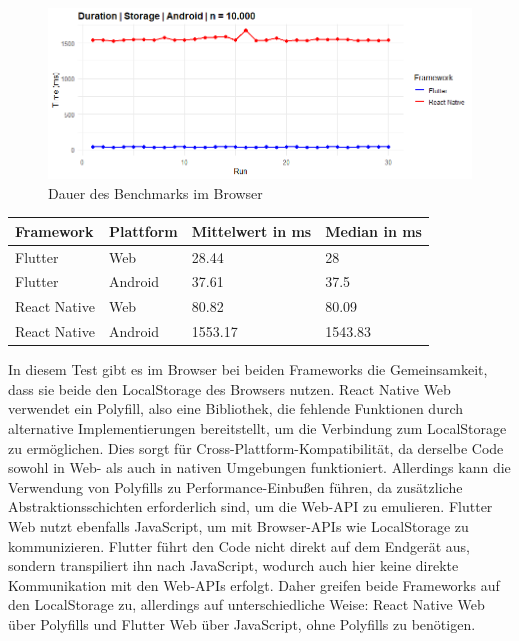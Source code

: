 \begin{figure}[H]
    \centering
    \includegraphics[width=1\linewidth]{images/android/Storage.png}
    \caption{Dauer des Benchmarks im Browser}
\end{figure}

\begin{table}[h!]
    \centering
    \begin{tabular}{llll}
    \toprule
    \textbf{Framework} & \textbf{Plattform} & \textbf{Mittelwert in ms} & \textbf{Median in ms} \\
    \midrule
        Flutter & Web & 28.44 & 28 \\
        Flutter & Android & 37.61 & 37.5 \\
        React Native & Web & 80.82 & 80.09 \\
        React Native & Android & 1553.17 & 1543.83 \\
    \bottomrule
    \end{tabular}
\end{table}


In diesem Test gibt es im Browser bei beiden Frameworks die Gemeinsamkeit, dass sie beide den LocalStorage des Browsers nutzen. React Native Web verwendet ein Polyfill, also eine Bibliothek, die fehlende Funktionen durch alternative Implementierungen bereitstellt, um die Verbindung zum LocalStorage zu ermöglichen. Dies sorgt für Cross-Plattform-Kompatibilität, da derselbe Code sowohl in Web- als auch in nativen Umgebungen funktioniert. Allerdings kann die Verwendung von Polyfills zu Performance-Einbußen führen, da zusätzliche Abstraktionsschichten erforderlich sind, um die Web-API zu emulieren. Flutter Web nutzt ebenfalls JavaScript, um mit Browser-APIs wie LocalStorage zu kommunizieren. Flutter führt den Code nicht direkt auf dem Endgerät aus, sondern transpiliert ihn nach JavaScript, wodurch auch hier keine direkte Kommunikation mit den Web-APIs erfolgt. Daher greifen beide Frameworks auf den LocalStorage zu, allerdings auf unterschiedliche Weise: React Native Web über Polyfills und Flutter Web über JavaScript, ohne Polyfills zu benötigen.

